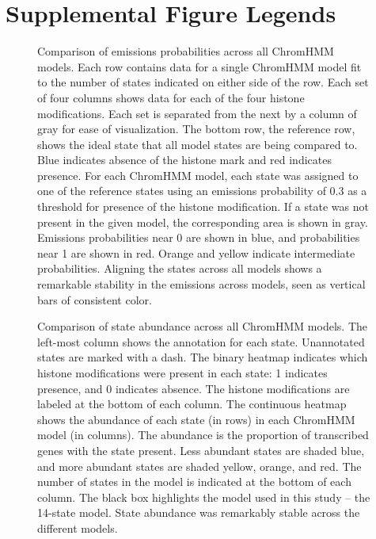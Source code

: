 \documentclass[10pt,letterpaper]{article}
\begin{document}
\pagebreak

\hypertarget{supplemental-figure-legends}{%
\section{Supplemental Figure
Legends}\label{supplemental-figure-legends}}

\begin{figure}[ht]
\centering
\caption{Comparison of emissions probabilities across all ChromHMM models.
Each row contains data for a single ChromHMM model fit to the number of
states indicated on either side of the row. Each set of four columns shows
data for each of the four histone modifications. Each set is separated from
the next by a column of gray for ease of visualization. The bottom row, the
reference row, shows the ideal state that all model states are being compared
to. Blue indicates absence of the histone mark and red indicates presence.
For each ChromHMM model, each state was assigned to one of the reference states
using an emissions probability of 0.3 as a threshold for presence of the histone
modification. If a state was not present in the given model, the corresponding
area is shown in gray. Emissions probabilities near 0 are shown in blue, and 
probabilities near 1 are shown in red. Orange and yellow indicate intermediate
probabilities. Aligning the states across all models shows a remarkable 
stability in the emissions across models, seen as vertical bars of consistent 
color.}
\label{supp_fig:model_emissions_comparison}
\end{figure}

\begin{figure}[ht]
\centering
\caption{Comparison of state abundance across all ChromHMM models. The left-most column
shows the annotation for each state. Unannotated states are marked with a dash. The 
binary heatmap indicates which histone modifications were present in each state: 1 
indicates presence, and 0 indicates absence. The histone modifications are labeled
at the bottom of each column. The continuous heatmap shows the abundance of each state
(in rows) in each ChromHMM model (in columns). The abundance is the proportion of 
transcribed genes with the state present. Less abundant states are shaded blue, and 
more abundant states are shaded yellow, orange, and red. The number of states in the
model is indicated at the bottom of each column. The black box highlights the model
used in this study -- the 14-state model. State abundance was remarkably
stable across the different models.}
\label{supp_fig:model_abundance_comparison}
\end{figure}
\end{document}

